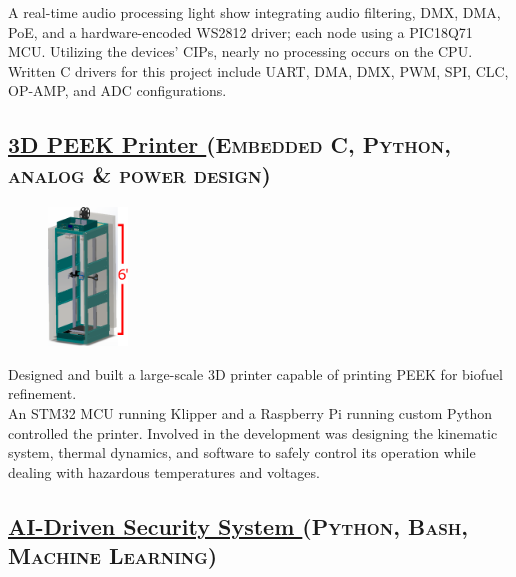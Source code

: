\documentclass[
	10pt, %
]{FreemanCV}
\begin{document}
\begin{paracol}{2}
A real-time audio processing light show integrating audio filtering, DMX, DMA, PoE, and a hardware-encoded WS2812 driver; each node using a PIC18Q71 MCU. Utilizing the devices' CIPs, nearly no processing occurs on the CPU.\\

Written C drivers for this project include UART, DMA, DMX, PWM, SPI, CLC, OP-AMP, and ADC configurations.

\switchcolumn

\vspace*{-10pt}
\leavevmode \subsection{\href{https://github.com/jfcbooth/3dpp}{3D PEEK Printer \linkcolor\scriptsize\faLink}
\hfill
\textsc{\footnotesize{(Embedded C, Python, analog \& power design)}}}

\setlength\intextsep{-5pt} %
\begin{figure} %
	\hspace*{-5pt} %
    \includegraphics[width=60pt]{printer} %
\end{figure}

Designed and built a large-scale 3D printer capable of printing PEEK for biofuel refinement.\\

An STM32 MCU running Klipper and a Raspberry Pi running custom Python controlled the printer.
Involved in the development was designing the kinematic system, thermal dynamics, and software to safely control its operation
while dealing with hazardous temperatures and voltages.


\vspace*{0pt}
\leavevmode \subsection{\href{https://github.com/jfcbooth/security_system}{AI-Driven Security System \linkcolor\scriptsize\faLink}
\hfill
\textsc{\footnotesize{(Python, Bash, Machine Learning)}}}


\end{paracol}
\end{document}
